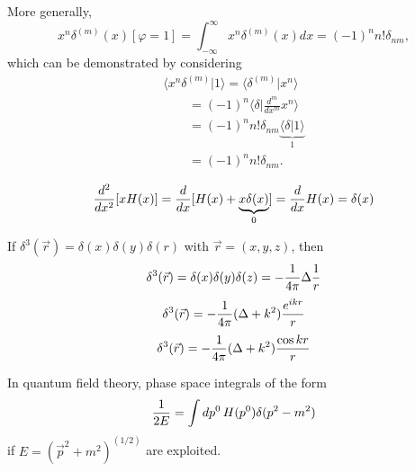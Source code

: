 More generally,
 \begin{equation}
x^n\delta^{(m)}(x)[\varphi =1] = \int _{-\infty}^\infty x^n\delta^{(m)}(x) dx  = (-1)^n n! \delta_{nm},
 \end{equation}
{\color{OliveGreen} \bproof
which can be demonstrated by considering
 \begin{equation}
 \begin{split}
 \langle x^n \delta^{(m)} \vert 1 \rangle
=
 \langle \delta^{(m)} \vert  x^n \rangle    \\ \qquad
=
(-1)^n
 \langle \delta \vert \frac{d^m}{d x^m}  x^n \rangle    \\ \qquad
=
(-1)^n n! \delta_{nm}
 \underbrace{\langle \delta \vert 1 \rangle}_{1}      \\ \qquad
=
(-1)^n n! \delta_{nm} .
\end{split}
 \end{equation}
\eproof
}

 \begin{equation}
 {d^2\over dx^2}[x H (x)] = {d \over dx }[H(x) + \underbrace{x \delta  (x)}_{0}]={d \over dx } H(x)  = \delta (x)
 \end{equation}

If $ \delta^{3} ({\vec r})=
\delta (x)
\delta (y)
\delta (r)$ with ${\vec r}=(x,y,z)$, then
 \begin{equation}
 \delta^{3} ({\vec r})=\delta (x)\delta (y)\delta (z)=-{1\over 4\pi }\Delta {1\over  r }
 \end{equation}
 \begin{equation}
 \delta^{3}  ({\vec r})=-{1\over 4\pi }(\Delta +k^2){e^{ikr}\over r}
 \end{equation}
 \begin{equation}
 \delta^{3}  ({\vec r})=-{1\over 4\pi }(\Delta +k^2){\cos kr\over r}
 \end{equation}

In quantum field theory,  phase space integrals of the form
 \begin{equation}
 {1\over 2E}=\int dp^0 \, H (p^0)\delta (p^2-m^2)
 \end{equation}
 if $E=({\vec p}^2+m^2)^{(1/2)}$
 are exploited.




